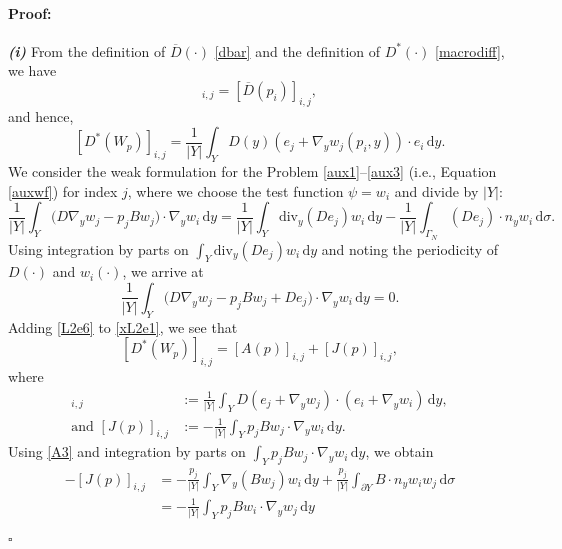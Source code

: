 \documentclass[10pt,a4paper]{amsart}
\newcommand{\di}[1]{\,\mathrm{d}#1}
\newenvironment{proof}{\paragraph{Proof:}}{\hfill$\square$}
\begin{document}
\begin{proof}

    \par \textbf{\textit{(i)}} From the definition of $\overline{D}(\cdot)$ \eqref{dbar} and the definition of $D^*(\cdot)$ \eqref{macrodiff}, we have
    \begin{equation}
       [ D^*(W_p)]_{i,j}=[\overline{D}(p_i)]_{i,j},\label{Q}
    \end{equation}
    and hence,
\begin{equation}\label{xL2e1}
    [D^*(W_p)]_{i,j}=\frac{1}{|Y|}\int_Y D(y)\left(e_j+\nabla_y w_j(p_i,y)\right)\cdot e_i \di{y}.
\end{equation}
We consider the weak formulation for the Problem \eqref{aux1}--\eqref{aux3} (i.e., Equation \eqref{auxwf}) for index $j$, where we choose the test function $\psi=w_i$ and divide by $|Y|$:
%
\begin{equation}\label{L2e5}
    \frac{1}{|Y|}\int_{Y}\big(D\nabla_y w_j- p_jBw_j\big)\cdot \nabla_y w_i\di{y}
    =\frac{1}{|Y|}\int_Y\text{div}_y(D e_j)w_i\di{y}-\frac{1}{|Y|}\int_{\Gamma_N}\left( De_j\right)\cdot n_y w_i\di{\sigma}.
\end{equation}
Using integration by parts on $\int_Y\text{div}_y(D e_j)w_i\di{y}$ and noting the periodicity of $D(\cdot)$ and $w_i(\cdot)$, we arrive at
\begin{equation}\label{L2e6}
    \frac{1}{|Y|}\int_{Y}\big( D\nabla_y w_j- p_jBw_j+D e_j\big)\cdot \nabla_yw_i \di{y} =0.
\end{equation}
Adding \eqref{L2e6} to \eqref{xL2e1}, we see that
\begin{equation}\label{L2e7}
    [D^*(W_p)]_{i,j}=[A(p)]_{i,j}+[J(p)]_{i,j},
\end{equation}
where 
\begin{align}
    [A(p)]_{i,j}&:=\frac{1}{|Y|}\int_Y D(e_j+\nabla_yw_j)\cdot 
    (e_i+\nabla_y w_i)\di{y},\label{L2e8}\\
   \text{and } [J(p)]_{i,j}&:=-\frac{1}{|Y|}\int_{Y}p_jBw_j\cdot \nabla_y w_i\di{y}.\label{L2e9}
\end{align}
Using \ref{A3} and integration by parts on $\int_{Y}p_jBw_j\cdot \nabla_y w_i\di{y}$, we obtain
\begin{align}
    -[J(p)]_{i,j}&=-\frac{p_j}{|Y|}\int_{Y}\nabla_y(Bw_j)  w_i\di{y}+\frac{p_j}{|Y|}\int_{\partial Y}B\cdot n_y w_iw_j\di{\sigma}\nonumber\\
    &=-\frac{1}{|Y|}\int_{Y}p_jBw_i\cdot \nabla_y w_j\di{y}\nonumber\\

\end{align}
\end{proof}
\end{document}
